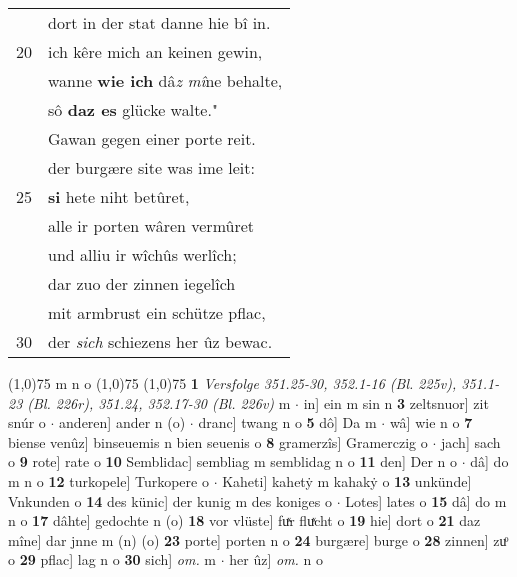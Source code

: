 \documentclass[8pt,a4paper,notitlepage]{article}
\begin{document}
\begin{table}[ht]
\begin{minipage}[t]{0.5\linewidth}
\begin{tabular}{rl}
 & dort in der stat danne hie bî in.\\ 
20 & ich kêre mich an keinen gewin,\\ 
 & wanne \textbf{wie ich} dâ\textit{z} \textit{mî}ne behalte,\\ 
 & sô \textbf{daz es} glücke walte."\\ 
 & Gawan gegen einer porte reit.\\ 
 & der burgære site was ime leit:\\ 
25 & \textbf{si} hete niht betûret,\\ 
 & alle ir porten wâren vermûret\\ 
 & und alliu ir wîchûs werlîch;\\ 
 & dar zuo der zinnen iegelîch\\ 
 & mit armbrust ein schütze pflac,\\ 
30 & der \textit{sich} schiezens her ûz bewac.\\ 
\end{tabular}
\scriptsize
\line(1,0){75} \newline
m n o \newline
\line(1,0){75} \newline
\newline
\line(1,0){75} \newline
\textbf{1} \textit{Versfolge 351.25-30, 352.1-16 (Bl. 225v), 351.1-23 (Bl. 226r), 351.24, 352.17-30 (Bl. 226v)} m   $\cdot$ in] ein m sin n \textbf{3} zeltsnuor] zit snúr o  $\cdot$ anderen] ander n (o)  $\cdot$ dranc] twang n o \textbf{5} dô] Da m  $\cdot$ wâ] wie n o \textbf{7} biense venûz] binseuemis n bien seuenis o \textbf{8} gramerzîs] Gramerczig o  $\cdot$ jach] sach o \textbf{9} rote] rate o \textbf{10} Semblidac] sembliag m semblidag n o \textbf{11} den] Der n o  $\cdot$ dâ] do m n o \textbf{12} turkopele] Turkopere o  $\cdot$ Kaheti] kahetẏ m kahakẏ o \textbf{13} unkünde] Vnkunden o \textbf{14} des künic] der kunig m des koniges o  $\cdot$ Lotes] lates o \textbf{15} dâ] do m n o \textbf{17} dâhte] gedochte n (o) \textbf{18} vor vlüste] fuͯr fluͯcht o \textbf{19} hie] dort o \textbf{21} daz mîne] dar jnne m (n) (o) \textbf{23} porte] porten n o \textbf{24} burgære] burge o \textbf{28} zinnen] zuͦ o \textbf{29} pflac] lag n o \textbf{30} sich] \textit{om.} m  $\cdot$ her ûz] \textit{om.} n o \newline
\end{minipage}
\end{table}
\newpage
\end{document}
